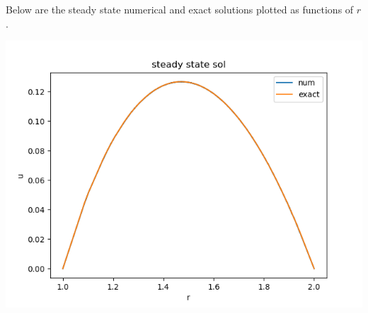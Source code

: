 \documentclass{article}
\begin{document}
\begin{enumerate}[label=(\alph*)]
Below are the steady state numerical and exact solutions plotted as functions of $r$.

\begin{center}
	\includegraphics[scale=.6]{hw10 steady state sol}
\end{center}

\end{enumerate}


	
\end{document}
